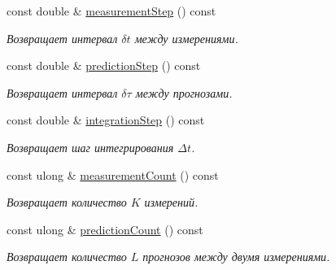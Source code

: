 \begin{DoxyCompactItemize}
const double \& \hyperlink{class_core_1_1_filter_parameters_a1e868b7a370df88dbd65c1ffe22e1f32}{measurement\+Step} () const
\begin{DoxyCompactList}\small\item\em Возвращает интервал $\delta t$ между измерениями. \end{DoxyCompactList}\item 
\hypertarget{class_core_1_1_filter_parameters_a944d97bb305c33fd713c47948030976b}{}\label{class_core_1_1_filter_parameters_a944d97bb305c33fd713c47948030976b} 
const double \& \hyperlink{class_core_1_1_filter_parameters_a944d97bb305c33fd713c47948030976b}{prediction\+Step} () const
\begin{DoxyCompactList}\small\item\em Возвращает интервал $\delta \tau$ между прогнозами. \end{DoxyCompactList}\item 
\hypertarget{class_core_1_1_filter_parameters_afec430374fa0ee07f6960a6b42fb85d0}{}\label{class_core_1_1_filter_parameters_afec430374fa0ee07f6960a6b42fb85d0} 
const double \& \hyperlink{class_core_1_1_filter_parameters_afec430374fa0ee07f6960a6b42fb85d0}{integration\+Step} () const
\begin{DoxyCompactList}\small\item\em Возвращает шаг интегрирования $\Delta t$. \end{DoxyCompactList}\item 
\hypertarget{class_core_1_1_filter_parameters_a3db7701620d536221b0d95e29c8d6b39}{}\label{class_core_1_1_filter_parameters_a3db7701620d536221b0d95e29c8d6b39} 
const ulong \& \hyperlink{class_core_1_1_filter_parameters_a3db7701620d536221b0d95e29c8d6b39}{measurement\+Count} () const
\begin{DoxyCompactList}\small\item\em Возвращает количество $K$ измерений. \end{DoxyCompactList}\item 
\hypertarget{class_core_1_1_filter_parameters_a4e29aa5b52c75ab0f53ba8f571b98f6a}{}\label{class_core_1_1_filter_parameters_a4e29aa5b52c75ab0f53ba8f571b98f6a} 
const ulong \& \hyperlink{class_core_1_1_filter_parameters_a4e29aa5b52c75ab0f53ba8f571b98f6a}{prediction\+Count} () const
\begin{DoxyCompactList}\small\item\em Возвращает количество $L$ прогнозов между двумя измерениями. \end{DoxyCompactList}\item 

\end{DoxyCompactItemize}
